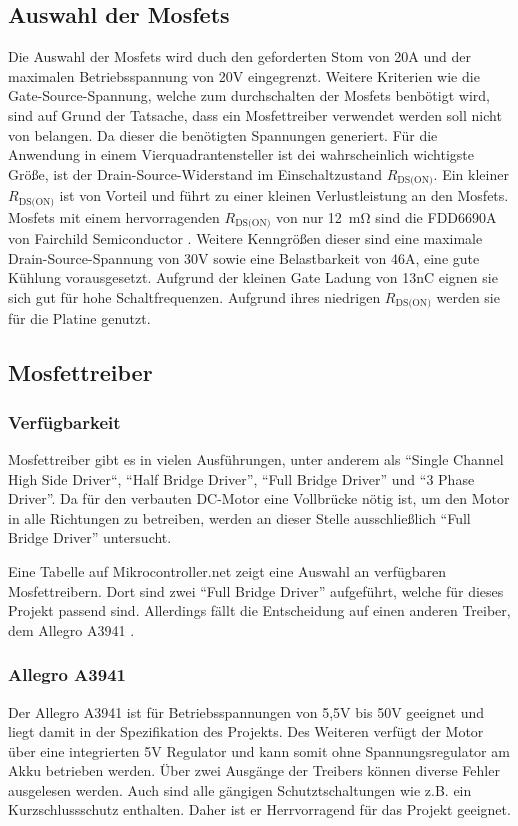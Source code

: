 \subsection{Auswahl der Mosfets}
Die Auswahl der Mosfets wird duch den geforderten Stom von 20A und der maximalen Betriebsspannung von 20V eingegrenzt. Weitere Kriterien wie die Gate-Source-Spannung, welche zum durchschalten
der Mosfets benbötigt wird, sind auf Grund der Tatsache, dass ein Mosfettreiber verwendet werden soll nicht von belangen. Da dieser die benötigten Spannungen generiert.
Für die Anwendung in einem Vierquadrantensteller ist dei wahrscheinlich wichtigste Größe, ist der Drain-Source-Widerstand im Einschaltzustand $R_{\text{DS(ON)}}$.
Ein kleiner $R_{\text{DS(ON)}}$ ist von Vorteil und führt zu einer kleinen Verlustleistung an den Mosfets.
Mosfets mit einem hervorragenden $R_{\text{DS(ON)}}$ von nur \SI{12}{\mohm} sind die FDD6690A von Fairchild Semiconductor \cite{ds-fs}. Weitere Kenngrößen dieser sind
eine maximale Drain-Source-Spannung von 30V sowie eine Belastbarkeit von 46A, eine gute Kühlung vorausgesetzt. Aufgrund der kleinen Gate Ladung von 13nC eignen
sie sich gut für hohe Schaltfrequenzen. Aufgrund ihres niedrigen $R_{\text{DS(ON)}}$ werden sie für die Platine genutzt.


\subsection{Mosfettreiber}

\subsubsection{Verfügbarkeit}

Mosfettreiber gibt es in vielen Ausführungen, unter anderem als ``Single Channel High Side Driver``, ``Half Bridge Driver'', ``Full Bridge Driver''
und ``3 Phase Driver''. Da für den verbauten DC-Motor eine Vollbrücke nötig ist, um den Motor in alle Richtungen zu betreiben, werden an dieser Stelle
ausschließlich ``Full Bridge Driver'' untersucht.

Eine Tabelle auf Mikrocontroller.net\cite{FET_D_TABLE} zeigt eine Auswahl an verfügbaren Mosfettreibern. Dort sind zwei
``Full Bridge Driver'' aufgeführt, welche für dieses Projekt passend sind. Allerdings fällt die Entscheidung auf einen anderen Treiber,
dem Allegro A3941 \cite{ds-A3941}.
\subsubsection{Allegro A3941}
Der Allegro A3941  ist für Betriebsspannungen von 5,5V bis 50V geeignet und liegt damit in der Spezifikation des Projekts.
Des Weiteren verfügt der Motor über eine integrierten 5V Regulator und kann somit ohne Spannungsregulator am Akku betrieben werden.
Über zwei Ausgänge der Treibers können diverse Fehler ausgelesen werden. Auch sind alle gängigen Schutztschaltungen wie z.B. ein Kurzschlussschutz enthalten.
Daher ist er Herrvorragend für das Projekt geeignet.


